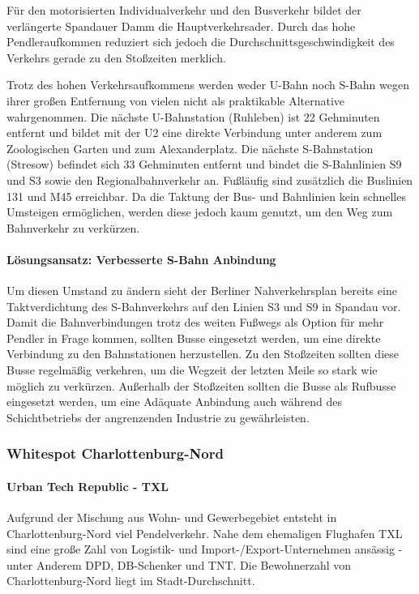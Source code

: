 Für den motorisierten Individualverkehr und den Busverkehr bildet der verlängerte Spandauer Damm die Hauptverkehrsader. Durch das hohe Pendleraufkommen reduziert sich jedoch die Durchschnittsgeschwindigkeit des Verkehrs gerade zu den Stoßzeiten merklich.

Trotz des hohen Verkehrsaufkommens werden weder U-Bahn noch S-Bahn wegen ihrer großen Entfernung von vielen nicht als praktikable Alternative wahrgenommen. Die nächste U-Bahnstation (Ruhleben) ist 22 Gehminuten entfernt und bildet mit der U2 eine direkte Verbindung unter anderem zum Zoologischen Garten und zum Alexanderplatz. Die nächste S-Bahnstation (Stresow) befindet sich 33 Gehminuten entfernt und bindet die S-Bahnlinien S9 und S3 sowie den Regionalbahnverkehr an. Fußläufig sind zusätzlich die Buslinien 131 und M45 erreichbar. Da die Taktung der Bus- und Bahnlinien kein schnelles Umsteigen ermöglichen, werden diese jedoch kaum genutzt, um den Weg zum Bahnverkehr zu verkürzen.

\paragraph{Lösungsansatz: Verbesserte S-Bahn Anbindung}
Um diesen Umstand zu ändern sieht der Berliner Nahverkehrsplan bereits eine Taktverdichtung des S-Bahnverkehrs auf den Linien S3 und S9 in Spandau vor. Damit die Bahnverbindungen trotz des weiten Fußwegs als Option für mehr Pendler in Frage kommen, sollten Busse eingesetzt werden, um eine direkte Verbindung zu den Bahnstationen herzustellen. Zu den Stoßzeiten sollten diese Busse regelmäßig verkehren, um die Wegzeit der letzten Meile so stark wie möglich zu verkürzen. Außerhalb der Stoßzeiten sollten die Busse als Rufbusse eingesetzt werden, um eine Adäquate Anbindung auch während des Schichtbetriebs der angrenzenden Industrie zu gewährleisten.










\subsubsection{Whitespot Charlottenburg-Nord}
\paragraph{Urban Tech Republic - TXL}
Aufgrund der Mischung aus Wohn- und Gewerbegebiet entsteht in Charlottenburg-Nord viel Pendelverkehr. Nahe dem ehemaligen Flughafen TXL sind eine große Zahl von Logistik- und Import-/Export-Unternehmen ansässig - unter Anderem DPD, DB-Schenker und TNT. Die Bewohnerzahl von Charlottenburg-Nord liegt im Stadt-Durchschnitt.

